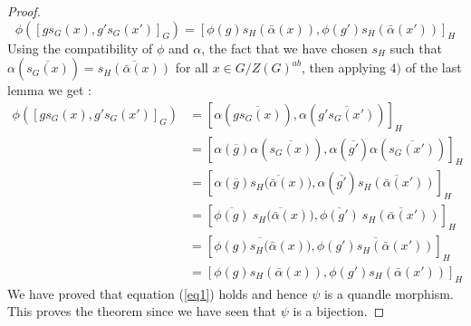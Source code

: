 \documentclass[10pt,a4paper]{amsart}
\begin{document}
\begin{proof}
\begin{equation}\label{eq1}
\phi([gs_G(x),g's_G(x')]_G)=[\phi(g)s_H(\bar{\alpha}(x)),\phi(g')s_H(\bar{\alpha}(x'))]_H
\end{equation}
Using the compatibility of $\phi$ and $\alpha$, the fact that we have chosen $s_H$ such that $\alpha(\overline{s_G(x)})=\overline{s_H(\bar{\alpha}(x))}$ for all $x\in G/Z(G)^{ab}$, then applying $4)$ of the last lemma we get :
\begin{equation}
\begin{split}
\phi([gs_G(x),g's_G(x')]_G)&=[\alpha(\overline{gs_G(x)}),\alpha(\overline{g's_G(x')})]_H \\
&= [\alpha(\overline{g}) \alpha(\overline{s_G(x)}),\alpha(\overline{g'}) \alpha(\overline{s_G(x')})]_H \\
&=[\alpha(\overline{g}) \overline{s_H(\bar{\alpha}(x)}),\alpha(\overline{g'})\overline{s_H(\bar{\alpha}(x'))}]_H \\
&=[\overline{\phi(g)} \: \overline{s_H(\bar{\alpha}(x)}),\overline{\phi(g')}\:\overline{s_H(\bar{\alpha}(x'))}]_H\\
&=[\overline{\phi(g)s_H(\bar{\alpha}(x)}),\overline{\phi(g')s_H(\bar{\alpha}(x'))}]_H\\
&=[\phi(g)s_H(\bar{\alpha}(x)),\phi(g')s_H(\bar{\alpha}(x'))]_H
\end{split}
\end{equation}
We have proved that equation (\ref{eq1}) holds and hence $\psi$ is a quandle morphism. This proves the theorem since we have seen that $\psi$ is a bijection.
\end{proof} 
\end{document}

